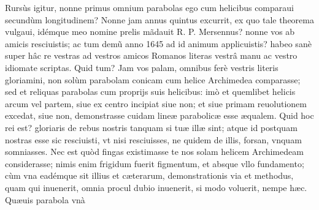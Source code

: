 \documentclass[11pt,a4paper]{article}
\begin{document}
Rursùs igitur, nonne primus omnium parabolas ego cum helicibus comparaui secundùm longitudinem? Nonne jam annus quintus excurrit, ex quo tale theorema vulgaui, idémque meo nomine prelis mãdauit R. P. Mersennus? nonne vos ab amicis resciuistis; ac tum demũ anno 1645 ad id animum applicuistis? habeo sanè super hâc re vestras ad vestros amicos Romanos literas vestrâ manu ac vestro idiomate scriptas. Quid tum? Jam vos palam, omnibus ferè vestris literis gloriamini, non solùm parabolam conicam cum helice Archimedea comparasse; sed et reliquas parabolas cum proprijs suis helicibus: imò et quemlibet helicis arcum vel partem, siue ex centro incipiat siue non; et siue primam reuolutionem excedat, siue non, demonstrasse cuidam lineæ parabolicæ esse æqualem. Quid hoc rei est? gloriaris de rebus nostris tanquam si tuæ illæ sint; atque id postquam nostras esse sic resciuisti, vt nisi resciuisses, ne quidem de illis, forsan, vnquam somniasses. Nec est quòd fingas existimasse te nos solam helicem Archimedeam considerasse; nimis enim frigidum fuerit figmentum, et absque vllo fundamento; cùm vna eadémque sit illius et cæterarum, demonstrationis via et methodus, quam qui inuenerit, omnia procul dubio inuenerit, si modo voluerit, nempe hæc. Quæuis parabola vnà

\end{document}
